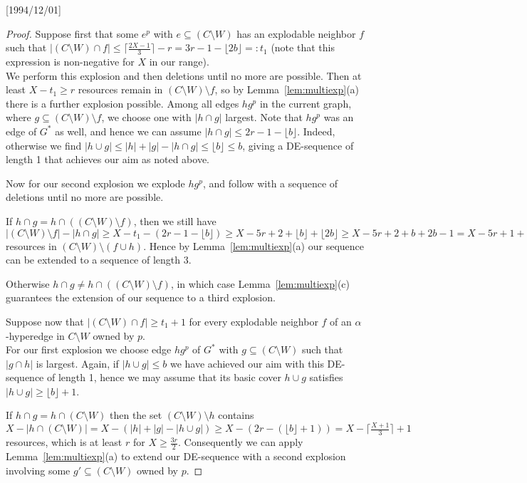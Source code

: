 \NeedsTeXFormat{LaTeX2e}[1994/12/01]\documentclass[letterpaper, 11pt]{article}
\theoremstyle{definition}
\theoremstyle{remark}
\numberwithin{equation}{section}
\begin{document}
\begin{proof}
Suppose first that some $e^p$ with $e\subseteq (C\setminus W)$ has an
explodable neighbor $f$ such that 
  $|(C\setminus W)\cap  f|\leq \lceil\frac{2X-1}{3}\rceil-r = 3r -1 -
  \lfloor 2b \rfloor=: t_1$
  (note that this expression is non-negative for $X$ in our range). \\
We perform this explosion and then deletions until no more are possible. 
Then at least $X-t_1\geq r$ 
resources remain in $(C\setminus W) \setminus f$, so
 by Lemma~\ref{lem:multiexp}(a) there is a further explosion
 possible.  Among all edges $hg^p$ in the current graph, where
 $g\subseteq(C\setminus W) \setminus f$,   we choose one 
 with  $|h\cap g|$ largest.
 Note that $hg^p$ was an edge of $G^*$ as well, and hence we can assume
 $|h\cap g | \leq 2r -1 - \lfloor b \rfloor$.
Indeed,
 otherwise we find
 $|h\cup g| \leq |h| + |g| -|h\cap g| \leq \lfloor b \rfloor
 \leq b$, giving a DE-sequence of length 1 that achieves our aim as
 noted above.


 Now for our second explosion we explode $hg^p$, and follow with a
 sequence of deletions until no more are possible. 

If $h\cap g= h\cap ((C\setminus W) \setminus f)$, then we still have 
$|(C\setminus W) \setminus f|
- |h\cap g| \geq X- t_1 - (2r -1 - \lfloor b \rfloor) \geq
X -5r +2 + \lfloor b \rfloor + \lfloor 2b \rfloor 
\geq X -5r +2 +b+2b -1 
= X-5r +1 +6r - (X+1) = r
$ resources in $(C\setminus W)\setminus (f\cup h)$.
Hence by Lemma~\ref{lem:multiexp}(a) our sequence can be extended to a
sequence of length $3$. 

Otherwise $h\cap g \neq h\cap ((C\setminus W)\setminus f)$, in which case
Lemma~\ref{lem:multiexp}(c) guarantees the extension of our
sequence to a third explosion. 

\medskip

 Suppose now  that $|(C\setminus W)\cap f|\geq
t_1 + 1$ for 
every explodable neighbor $f$ of an $\alpha$-hyperedge in $C\setminus
W$ owned by $p$. \\
For our first explosion we choose edge $hg^p$ of $G^*$
with $g\subseteq (C\setminus W)$ such that $|g\cap h|$ is largest.
Again, if $|h\cup g|\leq b$ we have achieved our aim with this
DE-sequence of length 1, hence we may assume that its basic cover
$h\cup g$ satisfies $|h\cup g| \geq \lfloor b \rfloor +1$.

If $h\cap g = h\cap (C\setminus W)$
then the set $(C\setminus W) \setminus h$ contains
$X-|h\cap (C\setminus W)| = X - (|h| +|g| -|h\cup g|)
\geq X- (2r - (\lfloor b \rfloor +1)) = 
X - \lceil \frac{X+1}{3} \rceil +1$ resources, which is at least $r$
for $X\geq \frac{3r}{2}$. Consequently we can apply
Lemma~\ref{lem:multiexp}(a) to extend our DE-sequence with a second
explosion involving some $g'\subseteq  (C\setminus W)$ owned by $p$.


\end{proof}
\end{document}
